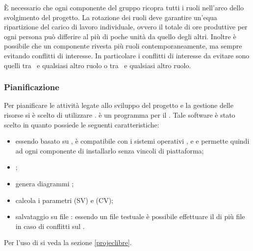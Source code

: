 \documentclass[12pt,a4paper]{article}
\begin{document}
È necessario che ogni componente del gruppo ricopra tutti i ruoli nell'arco dello svolgimento del progetto. La rotazione dei ruoli deve garantire un'equa ripartizione del carico di lavoro individuale, ovvero il totale di ore produttive per ogni persona può differire al più di poche unità da quello degli altri. Inoltre è possibile che un componente rivesta più ruoli contemporaneamente, ma sempre evitando conflitti di interesse. In particolare i conflitti di interesse da evitare sono quelli tra \PM\ e qualsiasi altro ruolo o tra \VR\ e qualsiasi altro ruolo.

\subsubsection{Pianificazione}
Per pianificare le attività legate allo sviluppo del progetto e la gestione delle risorse si è scelto di utilizzare .
 è un programma  per il . Tale software è stato scelto in quanto possiede le seguenti caratteristiche:
\begin{itemize}
	\item  essendo basato su , è compatibile con i sistemi operativi , e  e permette quindi ad ogni componente di installarlo senza vincoli di piattaforma; 
	\item {};
	\item genera diagrammi ;
	\item calcola i parametri  (SV) e  (CV);
	\item salvataggio su file : essendo un file testuale è possibile effettuare il  di più file in caso di conflitti sul .
\end{itemize}

Per l'uso di  si veda la sezione \ref{projeclibre}.
\end{document}
